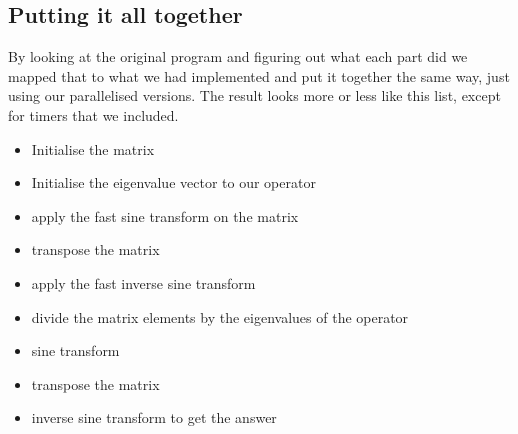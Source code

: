 \subsection{Putting it all together} 
By looking at the original program and figuring out what each part did we
mapped that to what we had implemented and put it together the same way, just
using our parallelised versions. The result looks more or less like this list,
except for timers that we included. 

\begin{itemize}
\item Initialise the matrix
\item Initialise the eigenvalue vector to our operator
\item apply the fast sine transform on the matrix
\item transpose the matrix
\item apply the fast inverse sine transform
\item divide the matrix elements by the eigenvalues of the operator 
\item sine transform
\item transpose the matrix
\item inverse sine transform to get the answer
\end{itemize}
